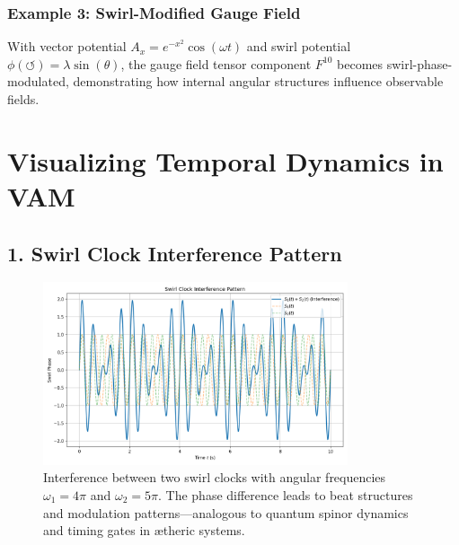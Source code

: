 \subsubsection*{Example 3: Swirl-Modified Gauge Field}
With vector potential $A_x = e^{-x^2}\cos(\omega t)$ and swirl potential $\phi(\circlearrowleft) = \lambda\sin(\theta)$, the gauge field tensor component $F^{10}$ becomes swirl-phase-modulated, demonstrating how internal angular structures influence observable fields.

\section*{Visualizing Temporal Dynamics in VAM}

\subsection*{1. Swirl Clock Interference Pattern}
\begin{figure}[H]
    \centering
    \includegraphics[width=0.8\textwidth]{images/SwirlClockInterference}
    \caption{Interference between two swirl clocks with angular frequencies $\omega_1 = 4\pi$ and $\omega_2 = 5\pi$. The phase difference leads to beat structures and modulation patterns—analogous to quantum spinor dynamics and timing gates in ætheric systems.}
    \label{fig:swirl_interference}
\end{figure}

